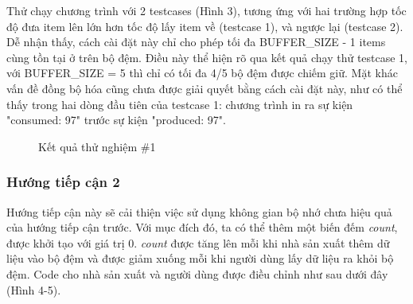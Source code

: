 \documentclass{article}
\begin{document}
Thử chạy chương trình với 2 testcases (Hình 3), tương ứng với hai trường hợp tốc độ đưa item
lên lớn hơn tốc độ lấy item về (testcase 1), và ngược lại (testcase 2). Dễ nhận thấy, cách cài đặt này chỉ cho phép
tối đa BUFFER\_SIZE - 1 items cùng tồn tại ở trên bộ đệm. Điều này thể hiện rõ qua kết quả chạy thử
testcase 1, với BUFFER\_SIZE = 5 thì chỉ có tối đa 4/5 bộ đệm được chiếm giữ. Mặt khác vấn đề
đồng bộ hóa cũng chưa được giải quyết bằng cách cài đặt này, như có thể thấy trong hai dòng đầu tiên
của testcase 1: chương trình in ra sự kiện "consumed: 97" trước sự kiện "produced: 97".
\begin{figure}[h]
    \centering

    \caption{Kết quả thử nghiệm \#1}
\end{figure}

\subsubsection{Hướng tiếp cận 2}
Hướng tiếp cận này sẽ cải thiện việc sử dụng không gian bộ nhớ chưa hiệu quả
của hướng tiếp cận trước. Với mục đích đó, ta có thể thêm một biến đếm \textit{count},
được khởi tạo với giá trị 0. \textit{count} được tăng lên mỗi khi nhà sản xuất thêm
dữ liệu vào bộ đệm và được giảm xuống mỗi khi người dùng lấy dữ liệu ra khỏi bộ đệm.
Code cho nhà sản xuất và người dùng được điều chỉnh như sau dưới đây (Hình 4-5). \\
\end{document}
